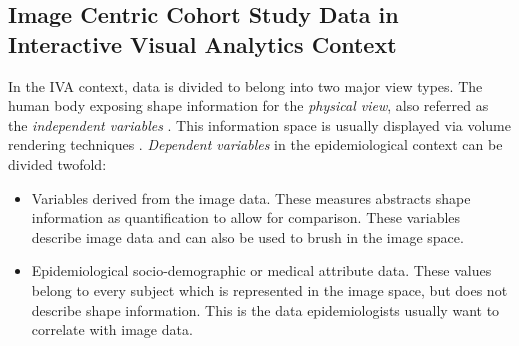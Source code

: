 \documentclass[journal]{style/vgtc}           %
\begin{document}
\subsection{Image Centric Cohort Study Data in Interactive Visual Analytics Context}
In the IVA context, data is divided to belong into two major view types.
%
The human body exposing shape information for the \emph{physical view}, also referred as the \emph{independent variables} \cite{Oeltze2013}.
%
This information space is usually displayed via volume rendering techniques \cite{Oeltze2007}.
%
%
\emph{Dependent variables} in the epidemiological context can be divided twofold:
\begin{itemize}
	\item Variables derived from the image data. 
	These measures abstracts shape information as quantification to allow for comparison. 
	These variables describe image data and can also be used to brush in the image space.
	\item Epidemiological socio-demographic or medical attribute data.
	These values belong to every subject which is represented in the image space, but does not describe shape information.
	This is the data epidemiologists usually want to correlate with image data.
\end{itemize}
%
% 
\end{document}
